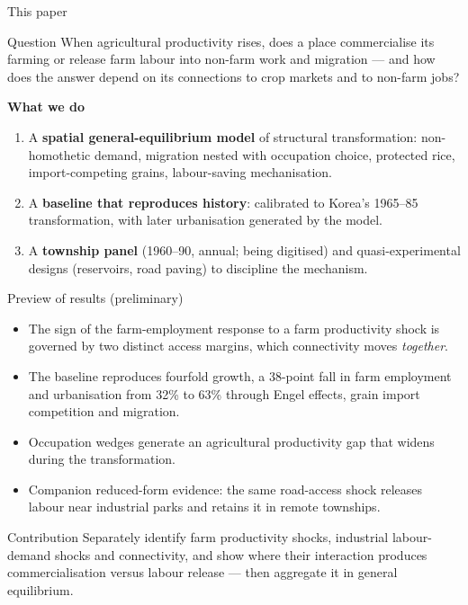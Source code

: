 \documentclass[10pt,aspectratio=169]{beamer}
\newcommand{\hl}[1]{\textcolor{mOrange}{#1}}
\begin{document}
\begin{frame}{This paper}
  \begin{block}{Question}
    When agricultural productivity rises, does a place \hl{commercialise} its farming or
    \hl{release} farm labour into non-farm work and migration --- and how does the answer
    depend on its connections to crop markets and to non-farm jobs?
  \end{block}
  \small
  \textbf{What we do}
  \begin{enumerate}
    \item A \textbf{spatial general-equilibrium model} of structural transformation:
          non-homothetic demand, migration nested with occupation choice, protected rice,
          import-competing grains, labour-saving mechanisation.
    \item A \textbf{baseline that reproduces history}: calibrated to Korea's 1965--85
          transformation, with later urbanisation generated by the model.
    \item A \textbf{township panel} (1960--90, annual; being digitised) and quasi-experimental
          designs (reservoirs, road paving) to discipline the mechanism.
  \end{enumerate}
\end{frame}

\begin{frame}{Preview of results (preliminary)}
  \begin{itemize}
    \item The sign of the farm-employment response to a farm productivity shock is governed by
          two distinct access margins, which connectivity moves \emph{together}.
    \item The baseline reproduces fourfold growth, a 38-point fall in farm employment and
          urbanisation from 32\% to 63\% through Engel effects, grain import competition
          and migration.
    \item Occupation wedges generate an agricultural productivity gap that \hl{widens}
          during the transformation.
    \item Companion reduced-form evidence: the same road-access shock releases labour near
          industrial parks and retains it in remote townships.
  \end{itemize}
  \vspace{0.5em}
  \begin{alertblock}{Contribution}
    Separately identify farm productivity shocks, industrial labour-demand shocks and
    connectivity, and show where their interaction produces commercialisation versus
    labour release --- then aggregate it in general equilibrium.
  \end{alertblock}
\end{frame}
\end{document}
